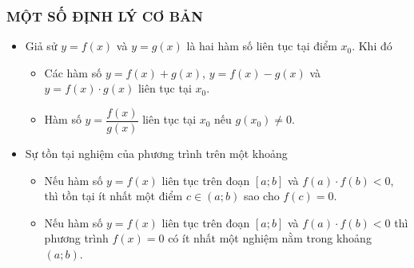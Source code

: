 \subsubsection{MỘT SỐ ĐỊNH LÝ CƠ BẢN}
\begin{itemize}
	\item [\iconMT]  Giả sử $y=f(x)$ và $y=g(x)$ là hai hàm số liên tục tại điểm $x_0$. Khi đó
	\begin{khung}
		\begin{itemize}
			\item Các hàm số $y=f(x)+g(x)$, $y=f(x)-g(x)$ và $y=f(x)\cdot g(x)$ liên tục tại $x_0$.
			\item Hàm số $y=\dfrac{f(x)}{g(x)}$ liên tục tại $x_0$ nếu $g(x_0)\neq 0$.
		\end{itemize}
	\end{khung}
	\item [\iconMT]  Sự tồn tại nghiệm của phương trình trên một khoảng
	\begin{khung}
		\begin{itemize}
			\item Nếu hàm số $y=f(x)$ liên tục trên đoạn $[a;b]$ và $f(a) \cdot f(b)<0$, thì tồn tại ít nhất một điểm $c\in (a;b)$ sao cho $f(c)=0$.
			\item Nếu hàm số $y=f(x)$ liên tục trên đoạn $[a;b]$ và $f(a)\cdot f(b)<0$ thì phương trình $f(x)=0$ có ít nhất một nghiệm nằm trong khoảng $(a;b)$.
		\end{itemize}
	\end{khung}
\end{itemize}
